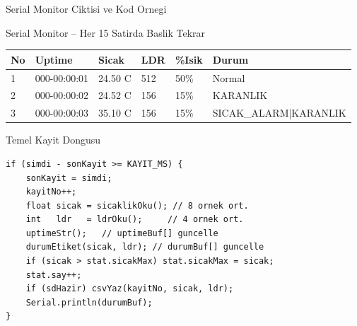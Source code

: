 \begin{frame}[fragile]{Serial Monitor Ciktisi ve Kod Ornegi}
  \begin{block}{Serial Monitor -- Her 15 Satirda Baslik Tekrar}
    \scriptsize\ttfamily
    \begin{tabular}{l|l|l|l|l|l}
      No & Uptime & Sicak & LDR & \%Isik & Durum \\
      \hline
      1 & 000-00:00:01 & 24.50 C & 512 & 50\% & Normal \\
      2 & 000-00:00:02 & 24.52 C & 156 & 15\% & KARANLIK \\
      3 & 000-00:00:03 & 35.10 C & 156 & 15\% & SICAK\_ALARM|KARANLIK \\
    \end{tabular}
  \end{block}
  \vspace{4pt}
  \begin{block}{Temel Kayit Dongusu}
    \begin{lstlisting}[style=arduino]
if (simdi - sonKayit >= KAYIT_MS) {
    sonKayit = simdi;
    kayitNo++;
    float sicak = sicaklikOku(); // 8 ornek ort.
    int   ldr   = ldrOku();     // 4 ornek ort.
    uptimeStr();   // uptimeBuf[] guncelle
    durumEtiket(sicak, ldr); // durumBuf[] guncelle
    if (sicak > stat.sicakMax) stat.sicakMax = sicak;
    stat.say++;
    if (sdHazir) csvYaz(kayitNo, sicak, ldr);
    Serial.println(durumBuf);
}
    \end{lstlisting}
  \end{block}
\end{frame}
